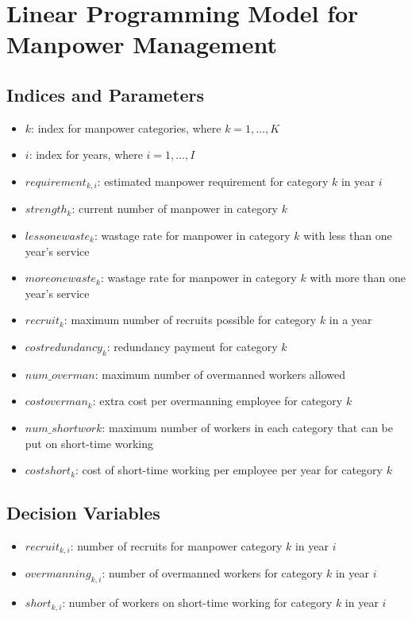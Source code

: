 \documentclass{article}
\begin{document}
\section*{Linear Programming Model for Manpower Management}

\subsection*{Indices and Parameters}
\begin{itemize}
    \item $k$: index for manpower categories, where $k = 1, \ldots, K$
    \item $i$: index for years, where $i = 1, \ldots, I$
    \item $requirement_{k,i}$: estimated manpower requirement for category $k$ in year $i$
    \item $strength_{k}$: current number of manpower in category $k$
    \item $lessonewaste_{k}$: wastage rate for manpower in category $k$ with less than one year's service
    \item $moreonewaste_{k}$: wastage rate for manpower in category $k$ with more than one year's service
    \item $recruit_{k}$: maximum number of recruits possible for category $k$ in a year
    \item $costredundancy_{k}$: redundancy payment for category $k$
    \item $num\_overman$: maximum number of overmanned workers allowed
    \item $costoverman_{k}$: extra cost per overmanning employee for category $k$
    \item $num\_shortwork$: maximum number of workers in each category that can be put on short-time working
    \item $costshort_{k}$: cost of short-time working per employee per year for category $k$
\end{itemize}

\subsection*{Decision Variables}
\begin{itemize}
    \item $recruit_{k,i}$: number of recruits for manpower category $k$ in year $i$
    \item $overmanning_{k,i}$: number of overmanned workers for category $k$ in year $i$
    \item $short_{k,i}$: number of workers on short-time working for category $k$ in year $i$
\end{itemize}
\end{document}
